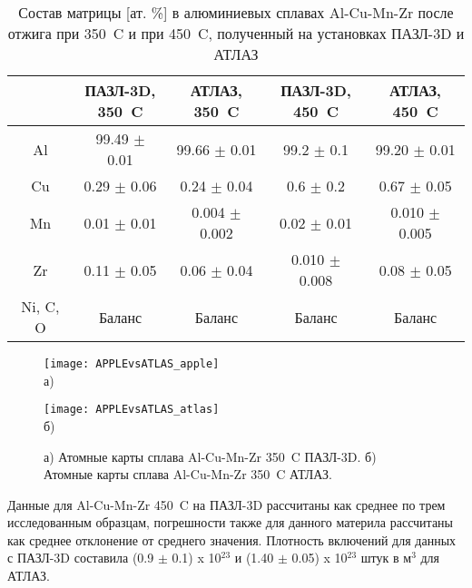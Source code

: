 \begin{table} [htbp]
	\centering
	\caption{Состав матрицы [ат. \%] в алюминиевых сплавах Al-Cu-Mn-Zr после отжига при 350~\textdegree C и при 450~\textdegree C, полученный
		на установках ПАЗЛ-3D и АТЛАЗ}
	\label{tab:matrixAPPLEvsATLAS}
	\begin{SingleSpace}
		\begin{tabular} {| c | c | c | c | c |}
			\hline
			{} & \thead{ПАЗЛ-3D, \\ 350~\textdegree C} & \thead{АТЛАЗ, \\ 350~\textdegree C} & \thead{ПАЗЛ-3D, \\ 450~\textdegree C} & \thead{АТЛАЗ, \\ 450~\textdegree C} \\ \hline
			Al       & 99.49 $\pm$ 0.01  & 99.66 $\pm$ 0.01 & 99.2 $\pm$ 0.1  & 99.20 $\pm$ 0.01  \\ \hline
			Cu       & 0.29 $\pm$ 0.06   & 0.24 $\pm$ 0.04  & 0.6 $\pm$ 0.2  & 0.67 $\pm$ 0.05  \\ \hline
			Mn       & 0.01 $\pm$ 0.01 & 0.004 $\pm$ 0.002 & 0.02 $\pm$ 0.01  & 0.010 $\pm$ 0.005 \\ \hline
			Zr       & 0.11 $\pm$ 0.05   & 0.06 $\pm$ 0.04 & 0.010 $\pm$ 0.008  & 
			0.08 $\pm$ 0.05   \\ \hline
			Ni, C, O & Баланс & Баланс & Баланс & Баланс  \\ \hline			
		\end{tabular}
	\end{SingleSpace}
\end{table}


\begin{figure}[h!tb]
	\begin{minipage}[b][][b]{0.49\textwidth}\centering
		\texttt{[image: APPLEvsATLAS\_apple]} \\ а)
	\end{minipage}
	\begin{minipage}[b][][b]{0.49\textwidth}\centering
		\texttt{[image: APPLEvsATLAS\_atlas]} \\ б)
	\end{minipage}
	\caption{а) Атомные карты сплава Al-Cu-Mn-Zr 350~\textdegree C ПАЗЛ-3D. б) Атомные карты сплава Al-Cu-Mn-Zr 350~\textdegree C АТЛАЗ.}
	\label{fig:APPLEvsATLAS}
\end{figure} 

Данные для Al-Cu-Mn-Zr 450~\textdegree C на ПАЗЛ-3D рассчитаны как среднее по трем исследованным образцам, погрешности также для данного материла рассчитаны как среднее отклонение от среднего значения. Плотность включений для данных с ПАЗЛ-3D составила (0.9 $\pm$ 0.1) x 10$^{23}$ и (1.40 $\pm$ 0.05) x 10$^{23}$ штук в м$^3$ для АТЛАЗ.

